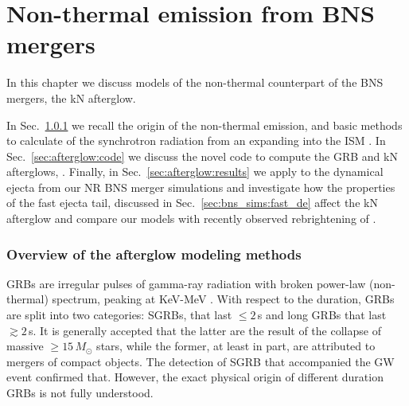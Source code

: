 
\chapter{Non-thermal emission from \ac{BNS} mergers} \label{ch:afterglow} 

In this chapter we discuss models of the non-thermal counterpart 
of the \ac{BNS} mergers, the \ac{kN} afterglow.

In Sec.~\ref{sec:intro:afterglow} we recall the origin of the non-thermal 
emission, and basic methods to calculate of the synchrotron 
radiation from an expanding into the \ac{ISM} \blast{}.
%
In Sec.~\ref{sec:afterglow:code} we discuss the novel 
code to compute the \ac{GRB} and \ac{kN} afterglows,
\pyblast{}. 
%
Finally, in Sec.~\ref{sec:afterglow:results} we apply \pyblast{} 
to the dynamical ejecta from our \ac{NR} 
\ac{BNS} merger simulations and investigate how the properties of the 
fast ejecta tail, discussed in Sec.~\ref{sec:bns_sims:fast_de} affect the 
\ac{kN} afterglow and compare our models with recently observed rebrightening 
of \GRB{}.
%




\subsection{Overview of the afterglow modeling methods}\label{sec:intro:afterglow}

\acp{GRB} are irregular pulses of gamma-ray radiation with broken power-law 
(non-thermal) spectrum, peaking at KeV-MeV \citep{Band:1993,Kouveliotou:1993,Meegan:1992xg}.
%
With respect to the duration, \acp{GRB} are split into two categories: \acp{SGRB}, 
that last ${\leq}2\,$s and long \acp{GRB} that last ${\gtrsim}2\,$s. 
It is generally accepted that the latter are the 
result of the collapse of massive ${\geq}15\,M_{\odot}$ stars, while the former, at 
least in part, are attributed to mergers of compact objects. 
%
The detection of \ac{SGRB} \GRB{} that accompanied 
the \ac{GW} event \GW{} \citep{TheLIGOScientific:2017qsa} confirmed that. 
However, the exact physical origin of different duration \acp{GRB} is not fully understood.
%

